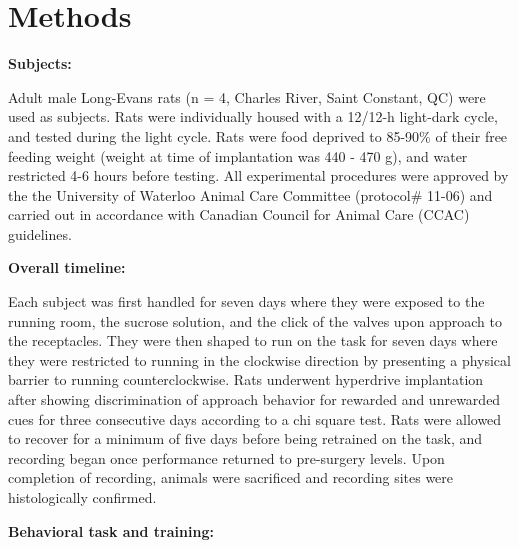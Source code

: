 \documentclass[11pt]{article}
\begin{document}
\section*{Methods}

{\bf Subjects:}

Adult male Long-Evans rats (n = 4, Charles River, Saint Constant, QC) were used as subjects. Rats were individually housed with a 12/12-h light-dark cycle, and tested during the light cycle. Rats were food deprived to 85-90\% of their free feeding weight (weight at time of implantation was 440 - 470 g), and water restricted 4-6 hours before testing. All experimental procedures were approved by the the University of Waterloo Animal Care Committee (protocol\# 11-06) and carried out in accordance with Canadian Council for Animal Care (CCAC) guidelines. 

{\bf Overall timeline:}

Each subject was first handled for seven days where they were exposed to the running room, the sucrose solution, and the click of the valves upon approach to the receptacles. They were then shaped to run on the task for seven days where they were restricted to running in the clockwise direction by presenting a physical barrier to running counterclockwise. Rats underwent hyperdrive implantation after showing discrimination of approach behavior for rewarded and unrewarded cues for three consecutive days according to a chi square test. Rats were allowed to recover for a minimum of five days before being retrained on the task, and recording began once performance returned to pre-surgery levels. Upon completion of recording, animals were sacrificed and recording sites were histologically confirmed.

{\bf Behavioral task and training:} 
\end{document}
